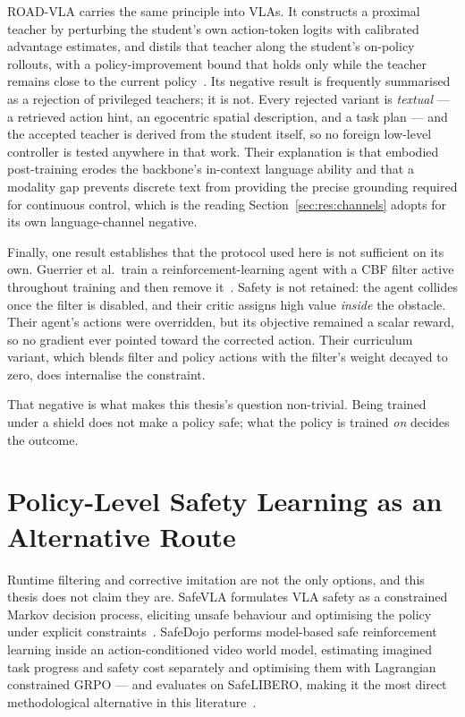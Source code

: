 ROAD-VLA carries the same principle into VLAs. It constructs a proximal teacher by perturbing the
student's own action-token logits with calibrated advantage estimates, and distils that teacher
along the student's on-policy rollouts, with a policy-improvement bound that holds only while the
teacher remains close to the current policy~\cite{wang2026roadvla}. Its negative result is
frequently summarised as a rejection of privileged teachers; it is not. Every rejected variant is
\emph{textual} --- a retrieved action hint, an egocentric spatial description, and a task plan ---
and the accepted teacher is derived from the student itself, so no foreign low-level controller is
tested anywhere in that work. Their explanation is that embodied post-training erodes the
backbone's in-context language ability and that a modality gap prevents discrete text from
providing the precise grounding required for continuous control, which is the reading
Section~\ref{sec:res:channels} adopts for its own language-channel negative.

Finally, one result establishes that the protocol used here is not sufficient on its own. Guerrier
et al.\ train a reinforcement-learning agent with a CBF filter active throughout training and then
remove it~\cite{guerrier2025guardrails}. Safety is not retained: the agent collides once the filter
is disabled, and their critic assigns high value \emph{inside} the obstacle. Their agent's actions
were overridden, but its objective remained a scalar reward, so no gradient ever pointed toward the
corrected action. Their curriculum variant, which blends filter and policy actions with the
filter's weight decayed to zero, does internalise the constraint.

That negative is what makes this thesis's question non-trivial. Being trained under a shield does
not make a policy safe; what the policy is trained \emph{on} decides the outcome.

\section{Policy-Level Safety Learning as an Alternative Route}\label{sec:bg:saferl}

Runtime filtering and corrective imitation are not the only options, and this thesis does not claim
they are. SafeVLA formulates VLA safety as a constrained Markov decision process, eliciting unsafe
behaviour and optimising the policy under explicit constraints~\cite{safevla}. SafeDojo performs
model-based safe reinforcement learning inside an action-conditioned video world model, estimating
imagined task progress and safety cost separately and optimising them with Lagrangian constrained
GRPO --- and evaluates on SafeLIBERO, making it the most direct methodological alternative in this
literature~\cite{safedojo}.

